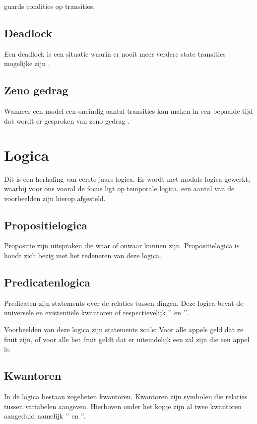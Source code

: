 \documentclass{article}
\begin{document}
guards condities op transities, 

\subsection{Deadlock}

Een deadlock is een situatie waarin er nooit meer verdere state transities mogelijke zijn \cite{uppaalintro}.

\subsection{Zeno gedrag}
Wanneer een model een oneindig aantal transities kan maken in een bepaalde tijd dat wordt er gesproken van zeno gedrag \cite{uppaaltutorialmodelingpatterns} \cite{leine2011zeno}.
\section{Logica}

Dit is een herhaling van eerste jaars logica. Er wordt met modale logica gewerkt, waarbij voor ons vooral de focus ligt op temporale logica, een aantal van de voorbeelden zijn hierop afgesteld.

\subsection{Propositielogica}

Propositie zijn uitspraken die waar of onwaar kunnen zijn. Propositielogica is houdt zich bezig met het redeneren van deze logica.

\subsection{Predicatenlogica} \label{PredicateLogic}

Predicaten zijn statements over de relaties tussen dingen. Deze logica bevat de universele en existentiële kwantoren of respectievelijk '\forall' en '\exists'.

Voorbeelden van deze logica zijn statements zoals: Voor alle appels geld dat ze fruit zijn, of voor alle het fruit geldt dat er uiteindelijk een zal zijn die een appel is.

\subsection{Kwantoren}

In de logica bestaan zogeheten kwantoren. Kwantoren zijn symbolen die relaties tussen variabelen aangeven. Hierboven onder het kopje  zijn al twee kwantoren aangeduid namelijk '\forall' en '\exists'.
\end{document}
